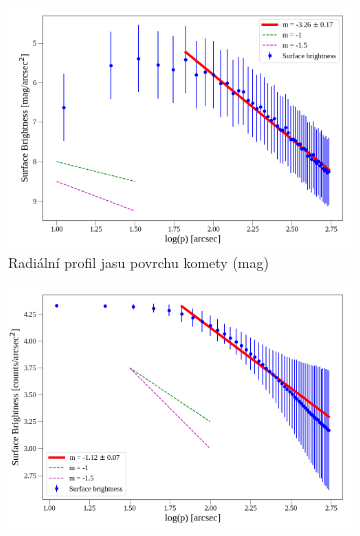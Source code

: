 \documentclass[a4paper,11pt]{article}
\begin{document}
    
    \nocite{*}
    

\newpage
    \begin{figure}[htbp]
        \centering
        \begin{subfigure}[t]{0.48\textwidth}
            \centering
            \includegraphics[width=\textwidth]{sbp.png}
            \captionsetup{justification=centering, font=footnotesize}
            \caption{Radiální profil jasu povrchu komety (mag)}
            \label{fig:sbp}
        \end{subfigure}
        \hfill 
        \begin{subfigure}[t]{0.48\textwidth}
            \centering
            \includegraphics[width=\textwidth]{sbp_counts.png}
            \captionsetup{justification=centering, font=footnotesize}

\end{subfigure}
\end{figure}
\end{document}
